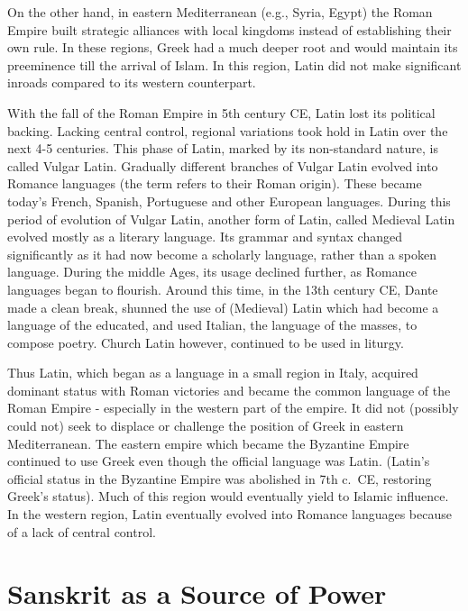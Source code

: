 On the other hand, in eastern Mediterranean (e.g., Syria, Egypt) the Roman Empire built strategic alliances with local kingdoms instead of establishing their own rule. In these regions, Greek had a much deeper root and would maintain its preeminence till the arrival of Islam. In this region, Latin did not make significant inroads compared to its western counterpart.

With the fall of the Roman Empire in 5th century CE, Latin lost its political backing. Lacking central control, regional variations took hold in Latin over the next 4-5 centuries. This phase of Latin, marked by its non-standard nature, is called Vulgar Latin. Gradually different branches of Vulgar Latin evolved into Romance languages (the term refers to their Roman origin). These became today’s French, Spanish, Portuguese and other European languages. During this period of evolution of Vulgar Latin, another form of Latin, called Medieval Latin evolved mostly as a literary language. Its grammar and syntax changed significantly as it had now become a scholarly language, rather than a spoken language. During the middle Ages, its usage declined further, as Romance languages began to flourish. Around this time, in the 13th century CE, Dante made a clean break, shunned the use of (Medieval) Latin which had become a language of the educated, and used Italian, the language of the masses, to compose poetry. Church Latin however, continued to be used in liturgy.

Thus Latin, which began as a language in a small region in Italy, acquired dominant status with Roman victories and became the common language of the Roman Empire - especially in the western part of the empire. It did not (possibly could not) seek to displace or challenge the position of Greek in eastern Mediterranean. The eastern empire which became the Byzantine Empire continued to use Greek even though the official language was Latin. (Latin’s official status in the Byzantine Empire was abolished in 7th c.\ CE, restoring Greek’s status). Much of this region would eventually yield to Islamic influence. In the western region, Latin eventually evolved into Romance languages because of a lack of central control.

\section{Sanskrit as a Source of Power}

